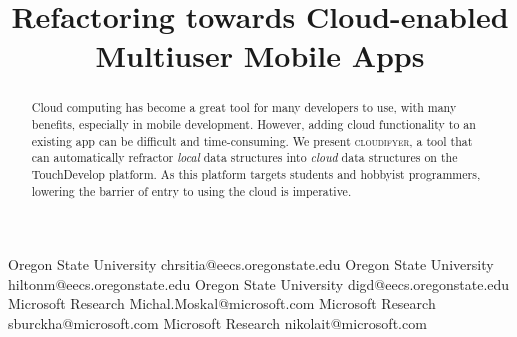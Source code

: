 \documentclass{sigplanconf}
\begin{document}
\setlength{\pdfpageheight}{\paperheight}
\setlength{\pdfpagewidth}{\paperwidth}






\title{Refactoring towards Cloud-enabled Multiuser Mobile Apps}

           {Oregon State University}
           {chrsitia@eecs.oregonstate.edu}
           {Oregon State University}
           {hiltonm@eecs.oregonstate.edu}
           {Oregon State University}
           {digd@eecs.oregonstate.edu}
           {Microsoft Research}
           {Michal.Moskal@microsoft.com}
           {Microsoft Research}
           {sburckha@microsoft.com}
           {Microsoft Research}
           {nikolait@microsoft.com}
\maketitle


\begin{abstract}
Cloud computing has become a great tool for many developers to use, with many benefits, especially in mobile development.  However, adding cloud functionality to an existing app can be difficult and time-consuming. We present \textsc{cloudifyer}, a tool that can automatically refractor \emph{local} data structures into \emph{cloud} data structures on the TouchDevelop platform.  As this platform targets students and hobbyist programmers, lowering the barrier of entry to using the cloud is imperative.
\end{abstract}
\end{document}

